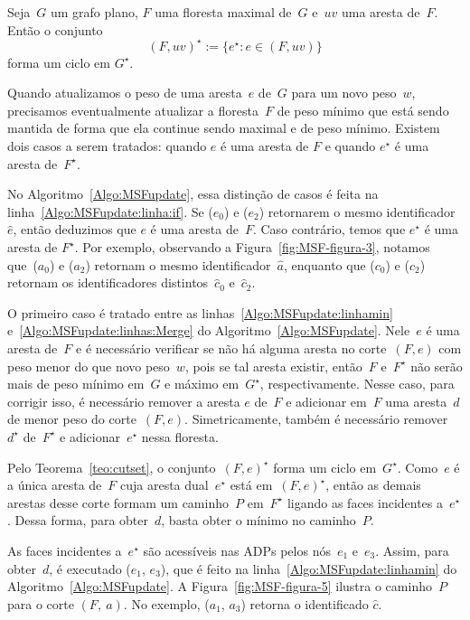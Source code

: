 \begin{theorem}
\label{teo:cutset}
Seja~$G$ um grafo plano, $F$ uma floresta maximal de~$G$ e~$uv$ uma aresta de~$F$.
Então o conjunto
$$
(F, uv)^\star := \{e^\star:e\in (F, uv)\}
$$
forma um ciclo em $G^\star$.
\end{theorem}

Quando atualizamos o peso de uma aresta~$e$ de~$G$ para um novo peso~$w$, precisamos eventualmente atualizar a floresta~$F$ de peso mínimo que está sendo mantida de forma que ela continue sendo maximal e de peso mínimo.
Existem dois casos a serem tratados: quando $e$ é uma aresta de $F$ e quando $e^\star$ é uma aresta de~$F^\star$.

No Algoritmo~\ref{Algo:MSFupdate}, essa distinção de casos é feita na linha~\ref{Algo:MSFupdate:linha:if}.
Se \LCOFindNode($e_0$) e \LCOFindNode($e_2$) retornarem o mesmo identificador~$\hat e$, então deduzimos que $e$ é uma aresta de~$F$.
Caso contrário, temos que $e^\star$ é uma aresta de $F^\star$.
Por exemplo, observando a Figura~\ref{fig:MSF-figura-3}, notamos que~\LCOFindNode($a_0$) e \LCOFindNode($a_2$) retornam o mesmo identificador~$\hat a$,
enquanto que \LCOFindNode($c_0$) e \LCOFindNode($c_2$) retornam os identificadores distintos~$\hat c_0$ e~$\hat c_2$.

O primeiro caso é tratado entre as linhas~\ref{Algo:MSFupdate:linhamin} e~\ref{Algo:MSFupdate:linhas:Merge} do Algoritmo~\ref{Algo:MSFupdate}.
Nele~$e$ é uma aresta de~$F$ e é necessário verificar se não há alguma aresta no corte~$(F, e)$ com peso menor do que novo peso~$w$, pois se tal aresta existir, então~$F$ e~$F^\star$ não serão mais de peso mínimo em~$G$ e máximo em~$G^\star$, respectivamente.
Nesse caso, para corrigir isso, é necessário remover a aresta $e$ de~$F$ e adicionar em~$F$ uma aresta~$d$ de menor peso do corte~$(F, e)$.
Simetricamente, também é necessário remover $d^\star$ de~$F^\star$ e adicionar~$e^\star$ nessa floresta.

Pelo Teorema~\ref{teo:cutset}, o conjunto~$(F, e)^\star$ forma um ciclo em~$G^\star$.
Como~$e$ é a única aresta de~$F$ cuja aresta dual~$e^\star$ está em~$(F, e)^\star$, então as demais arestas desse corte formam um caminho~$P$ em~$F^\star$ ligando as faces incidentes a~$e^\star$.
Dessa forma, para obter~$d$, basta obter o mínimo no caminho~$P$.

As faces incidentes a~$e^\star$ são acessíveis nas ADPs pelos nós~$e_1$ e~$e_3$.
Assim, para obter~$d$, é executado \LCOMin($e_1$, $e_3$), que é feito na linha~\ref{Algo:MSFupdate:linhamin} do Algoritmo~\ref{Algo:MSFupdate}.
A Figura~\ref{fig:MSF-figura-5} ilustra o caminho~$P$ para o corte $(F,~a)$.
No exemplo, \LCOMin($a_1$, $a_3$) retorna o identificado $\hat c$.


